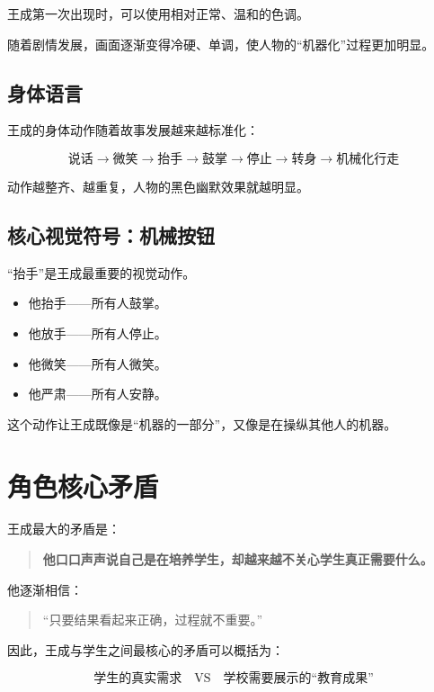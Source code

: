 \documentclass[12pt,a4paper]{ctexart}
\begin{document}
	王成第一次出现时，可以使用相对正常、温和的色调。
	
	随着剧情发展，画面逐渐变得冷硬、单调，使人物的“机器化”过程更加明显。
	
	\subsection{身体语言}
	
	王成的身体动作随着故事发展越来越标准化：
	
	\[
	\text{说话} \rightarrow \text{微笑} \rightarrow \text{抬手}
	\rightarrow \text{鼓掌} \rightarrow \text{停止} \rightarrow \text{转身}
	\rightarrow \text{机械化行走}
	\]
	
	动作越整齐、越重复，人物的黑色幽默效果就越明显。
	
	\subsection{核心视觉符号：机械按钮}
	
	“抬手”是王成最重要的视觉动作。
	
	\begin{itemize}[leftmargin=2em]
		\item 他抬手——所有人鼓掌。
		\item 他放手——所有人停止。
		\item 他微笑——所有人微笑。
		\item 他严肃——所有人安静。
	\end{itemize}
	
	这个动作让王成既像是“机器的一部分”，又像是在操纵其他人的机器。
	
	\section{角色核心矛盾}
	
	王成最大的矛盾是：
	
	\begin{quote}
		\textbf{他口口声声说自己是在培养学生，却越来越不关心学生真正需要什么。}
	\end{quote}
	
	他逐渐相信：
	
	\begin{quote}
		“只要结果看起来正确，过程就不重要。”
	\end{quote}
	
	因此，王成与学生之间最核心的矛盾可以概括为：
	
	\[
	\boxed{
		\text{学生的真实需求} \quad\mathrm{VS}\quad \text{学校需要展示的“教育成果”}
	}
	\]
	
\end{document}
